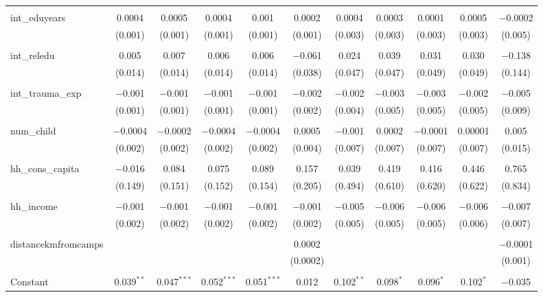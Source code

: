 \begin{table}[H]
\begin{tabular}{@{\extracolsep{4pt}}lcccccccccc}
  & & & & & & & & & & \\ 
 int\_eduyears & 0.0004 & 0.0005 & 0.0004 & 0.001 & 0.0002 & 0.0004 & 0.0003 & 0.0001 & 0.0005 & $-$0.0002 \\ 
  & (0.001) & (0.001) & (0.001) & (0.001) & (0.001) & (0.003) & (0.003) & (0.003) & (0.003) & (0.005) \\ 
  & & & & & & & & & & \\ 
 int\_reledu & 0.005 & 0.007 & 0.006 & 0.006 & $-$0.061 & 0.024 & 0.039 & 0.031 & 0.030 & $-$0.138 \\ 
  & (0.014) & (0.014) & (0.014) & (0.014) & (0.038) & (0.047) & (0.047) & (0.049) & (0.049) & (0.144) \\ 
  & & & & & & & & & & \\ 
 int\_trauma\_exp & $-$0.001 & $-$0.001 & $-$0.001 & $-$0.001 & $-$0.002 & $-$0.002 & $-$0.003 & $-$0.003 & $-$0.002 & $-$0.005 \\ 
  & (0.001) & (0.001) & (0.001) & (0.001) & (0.002) & (0.004) & (0.005) & (0.005) & (0.005) & (0.009) \\ 
  & & & & & & & & & & \\ 
 num\_child & $-$0.0004 & $-$0.0002 & $-$0.0004 & $-$0.0004 & 0.0005 & $-$0.001 & 0.0002 & $-$0.0001 & 0.00001 & 0.005 \\ 
  & (0.002) & (0.002) & (0.002) & (0.002) & (0.004) & (0.007) & (0.007) & (0.007) & (0.007) & (0.015) \\ 
  & & & & & & & & & & \\ 
 hh\_cons\_capita & $-$0.016 & 0.084 & 0.075 & 0.089 & 0.157 & 0.039 & 0.419 & 0.416 & 0.446 & 0.765 \\ 
  & (0.149) & (0.151) & (0.152) & (0.154) & (0.205) & (0.494) & (0.610) & (0.620) & (0.622) & (0.834) \\ 
  & & & & & & & & & & \\ 
 hh\_income & $-$0.001 & $-$0.001 & $-$0.001 & $-$0.001 & $-$0.001 & $-$0.005 & $-$0.006 & $-$0.006 & $-$0.006 & $-$0.007 \\ 
  & (0.002) & (0.002) & (0.002) & (0.002) & (0.002) & (0.005) & (0.005) & (0.005) & (0.006) & (0.007) \\ 
  & & & & & & & & & & \\ 
 distancekmfromcamps &  &  &  &  & 0.0002 &  &  &  &  & $-$0.0001 \\ 
  &  &  &  &  & (0.0002) &  &  &  &  & (0.001) \\ 
  & & & & & & & & & & \\ 
 Constant & 0.039$^{**}$ & 0.047$^{***}$ & 0.052$^{***}$ & 0.051$^{***}$ & 0.012 & 0.102$^{**}$ & 0.098$^{*}$ & 0.096$^{*}$ & 0.102$^{*}$ & $-$0.035 \\ 

\end{tabular}
\end{table}
